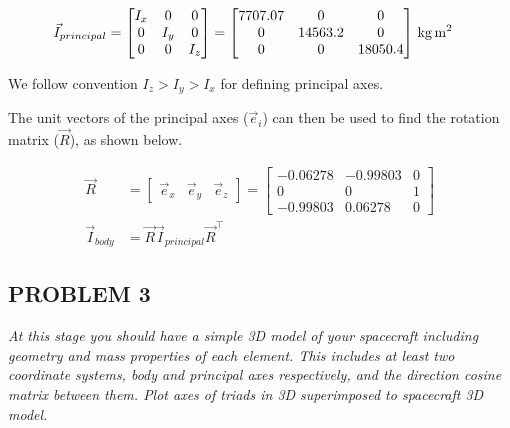\begin{align*}
\Vec{I}_{principal} &= 
    \begin{bmatrix}
    I_x & 0 & 0 \\
    0 & I_y & 0 \\
    0 & 0 & I_z 
    \end{bmatrix}
= 
\qty[parse-numbers = false]{
    \begin{bmatrix}
    7707.07 & 0 & 0 \\
    0 & 14563.2 & 0 \\
    0 & 0 & 18050.4 
    \end{bmatrix}
}{\kilogram\metre\squared}
\end{align*}

We follow convention $I_z > I_y > I_x$ for defining principal axes.

The unit vectors of the principal axes ($\Vec{e}_i$) can then be used to find the rotation matrix ($\Vec{R}$), as shown below.

\begin{align*}
\Vec{R} &= 
    \begin{bmatrix}
    \Vec{e}_x & \Vec{e}_y & \Vec{e}_z 
    \end{bmatrix}
= 
    \begin{bmatrix}
    -0.06278 & -0.99803 & 0 \\
    0 & 0 & 1 \\
    -0.99803 & 0.06278 & 0 
    \end{bmatrix} \\
    \Vec{I}_{body} &= \Vec{R} \Vec{I}_{principal} \Vec{R}^{\intercal}
\end{align*}


\subsection{PROBLEM 3}
\textit{At this stage you should have a simple 3D model of your spacecraft including geometry and mass properties of each element. This includes at least two coordinate systems, body and principal axes respectively, and the direction cosine matrix between them. Plot axes of triads in 3D superimposed to spacecraft 3D model.}

